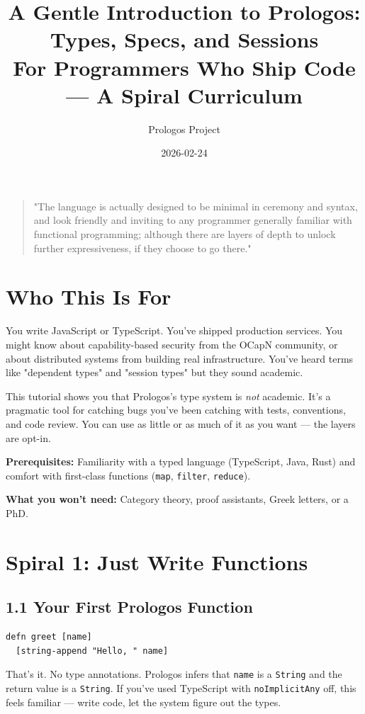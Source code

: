 \documentclass[11pt]{article}
\author{Prologos Project}
\date{2026-02-24}
\title{A Gentle Introduction to Prologos: Types, Specs, and Sessions\\\medskip
\large For Programmers Who Ship Code — A Spiral Curriculum}
\begin{document}
\maketitle
\tableofcontents

\begin{quote}
"The language is actually designed to be minimal in ceremony and syntax,
and look friendly and inviting to any programmer generally familiar with
functional programming; although there are layers of depth to unlock
further expressiveness, if they choose to go there."
\end{quote}
\section{Who This Is For}
\label{sec:org2d614a5}

You write JavaScript or TypeScript. You've shipped production services.
You might know about capability-based security from the OCapN community,
or about distributed systems from building real infrastructure. You've
heard terms like "dependent types" and "session types" but they sound
academic.

This tutorial shows you that Prologos's type system is \emph{not} academic.
It's a pragmatic tool for catching bugs you've been catching with tests,
conventions, and code review. You can use as little or as much of it as
you want --- the layers are opt-in.

\textbf{Prerequisites:} Familiarity with a typed language (TypeScript, Java, Rust)
and comfort with first-class functions (\texttt{map}, \texttt{filter}, \texttt{reduce}).

\textbf{What you won't need:} Category theory, proof assistants, Greek letters,
or a PhD.
\section{Spiral 1: Just Write Functions}
\label{sec:org6a284aa}

\subsection{1.1 Your First Prologos Function}
\label{sec:orga48c313}

\begin{verbatim}
defn greet [name]
  [string-append "Hello, " name]
\end{verbatim}

That's it. No type annotations. Prologos infers that \texttt{name} is a \texttt{String}
and the return value is a \texttt{String}. If you've used TypeScript with
\texttt{noImplicitAny} off, this feels familiar --- write code, let the system
figure out the types.
\end{document}
